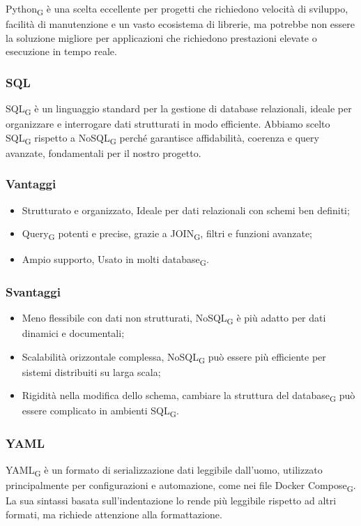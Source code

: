 Python\textsubscript{G} è una scelta eccellente per progetti che richiedono velocità di sviluppo, facilità di manutenzione e un vasto ecosistema di librerie, ma potrebbe non essere la soluzione migliore per applicazioni che richiedono prestazioni elevate o esecuzione in tempo reale.


\subsubsection{SQL}
SQL\textsubscript{G} è un linguaggio standard per la gestione di database relazionali, ideale per organizzare e interrogare dati strutturati in modo efficiente. Abbiamo scelto SQL\textsubscript{G} rispetto a NoSQL\textsubscript{G} perché garantisce affidabilità, coerenza e query avanzate, fondamentali per il nostro progetto.
\subsubsection{Vantaggi}
\begin{itemize}
    \item Strutturato e organizzato, Ideale per dati relazionali con schemi ben definiti;
    \item Query\textsubscript{G} potenti e precise, grazie a JOIN\textsubscript{G}, filtri e funzioni avanzate;
    \item Ampio supporto, Usato in molti database\textsubscript{G}.
\end{itemize}
\subsubsection{Svantaggi}
\begin{itemize}
    \item Meno flessibile con dati non strutturati, NoSQL\textsubscript{G} è più adatto per dati dinamici e documentali;
    \item Scalabilità orizzontale complessa, NoSQL\textsubscript{G} può essere più efficiente per sistemi distribuiti su larga scala;
    \item Rigidità nella modifica dello schema, cambiare la struttura del database\textsubscript{G} può essere complicato in ambienti SQL\textsubscript{G}.
\end{itemize}

\subsubsection{YAML}
YAML\textsubscript{G} è un formato di serializzazione dati leggibile dall’uomo, utilizzato principalmente per configurazioni e automazione, come nei file Docker Compose\textsubscript{G}. La sua sintassi basata sull’indentazione lo rende più leggibile rispetto ad altri formati, ma richiede attenzione alla formattazione.
